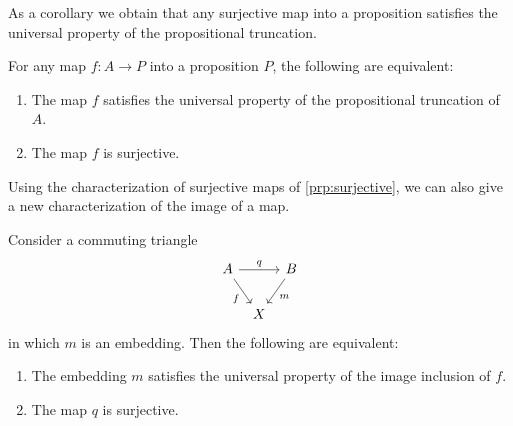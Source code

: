 As a corollary we obtain that any surjective map into a proposition satisfies the universal property of the propositional truncation.

\begin{cor}
  For any map $f:A\to P$ into a proposition $P$, the following are equivalent:
  \begin{enumerate}
  \item The map $f$ satisfies the universal property of the propositional truncation of $A$.
  \item The map $f$ is surjective.
  \end{enumerate}
\end{cor}

Using the characterization of surjective maps of \cref{prp:surjective}, we can also give a new characterization of the image of a map. 

\begin{thm}\label{thm:surjective}
Consider a commuting triangle
\begin{equation*}
\begin{tikzcd}[column sep=tiny]
A \arrow[rr,"q"] \arrow[dr,swap,"f"] & & B \arrow[dl,"m"] \\
& X
\end{tikzcd}
\end{equation*}
in which $m$ is an embedding. Then the following are equivalent:
\begin{enumerate}
\item The embedding $m$ satisfies the universal property of the image inclusion of $f$.
\item The map $q$ is surjective.
\end{enumerate}
\end{thm}

